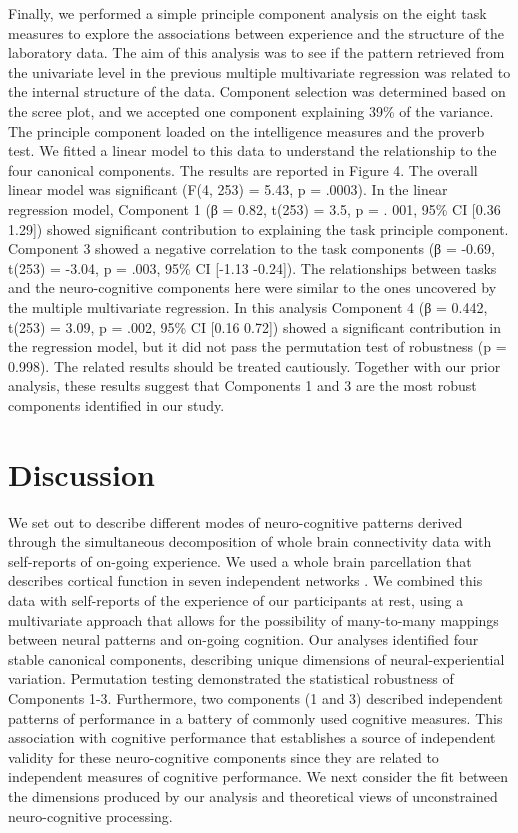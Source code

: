 Finally, we performed a simple principle component analysis on the eight task measures to explore the associations between experience and the structure of the laboratory data. The aim of this analysis was to see if the pattern retrieved from the univariate level in the previous multiple multivariate regression was related to the internal structure of the data. Component selection was determined based on the scree plot, and we accepted one component explaining 39\% of the variance. The principle component loaded on the intelligence measures and the proverb test. We fitted a linear model to this data to understand the relationship to the four canonical components. The results are reported in Figure 4. The overall linear model was significant (F(4, 253) = 5.43, p = .0003). In the linear regression model, Component 1 (β = 0.82, t(253) = 3.5, p = . 001, 95\% CI [0.36 1.29]) showed significant contribution to explaining the task principle component. Component 3 showed a negative correlation to the task components (β = -0.69, t(253) = -3.04, p = .003, 95\% CI [-1.13 -0.24]). The relationships between tasks and the neuro-cognitive components here were similar to the ones uncovered by the multiple multivariate regression. In this analysis Component 4 (β = 0.442, t(253) = 3.09, p = .002, 95\% CI [0.16 0.72]) showed a significant contribution in the regression model, but it did not pass the permutation test of robustness (p = 0.998). The related results should be treated cautiously. Together with our prior analysis, these results suggest that Components 1 and 3 are the most robust components identified in our study.


\section{Discussion}
\label{study2:discussion}
We set out to describe different modes of neuro-cognitive patterns derived through the simultaneous decomposition of whole brain connectivity data with self-reports of on-going experience. We used a whole brain parcellation that describes cortical function in seven independent networks \cite{Yeo2011}. 
We combined this data with self-reports of the experience of our participants at rest, using a multivariate approach that allows for the possibility of many-to-many mappings between neural patterns and on-going cognition. Our analyses identified four stable canonical components, describing unique dimensions of neural-experiential variation. Permutation testing demonstrated the statistical robustness of Components 1-3. Furthermore, two components (1 and 3) described independent patterns of performance in a battery of commonly used cognitive measures. This association with cognitive performance that establishes a source of independent validity for these neuro-cognitive components since they are related to independent measures of cognitive performance. We next consider the fit between the dimensions produced by our analysis and theoretical views of unconstrained neuro-cognitive processing.

